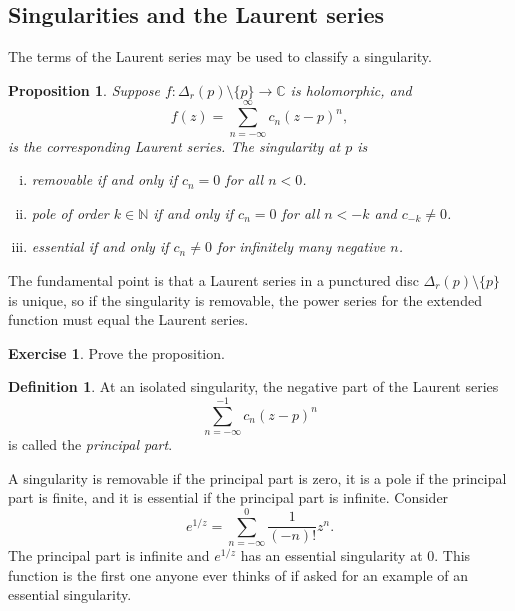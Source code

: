 \documentclass[12pt,openany]{book}
\newcommand{\C}{{\mathbb{C}}}
\newcommand{\N}{{\mathbb{N}}}
\newcommand{\myindex}[1]{#1\index{#1}}
\theoremstyle{plain}
\newtheorem{prop}[thm]{Proposition}
\theoremstyle{remark}
\theoremstyle{definition}
\newtheorem{defn}[thm]{Definition}
\newenvironment{exbox}{%
    \def\FrameCommand{\vrule width 1pt \relax\hspace{10pt}}%
    \MakeFramed{\advance\hsize-\width\FrameRestore}%
}{%
    \endMakeFramed
}
\theoremstyle{exercise}
\newtheorem{exercise}{Exercise}[section]
\theoremstyle{example}
\begin{document}
\subsection{Singularities and the Laurent series}

The terms of the Laurent series may be used to 
classify a singularity.

\begin{prop}
Suppose $f \colon \Delta_r(p) \setminus \{p\} \to \C$ is holomorphic,
and
\begin{equation*}
f(z) = \sum_{n=-\infty}^\infty c_n {(z-p)}^n ,
\end{equation*}
is the corresponding Laurent series.
The singularity at $p$ is
\begin{enumerate}[(i)]
\item \emph{removable} if and only if $c_n = 0$ for all $n < 0$.
\item \emph{pole} of order $k \in \N$ if and only if $c_n = 0$ for all $n < -k$ and
$c_{-k}
\not= 0$.
\item \emph{essential} if and only if $c_n \not= 0$ for infinitely many negative $n$.
\end{enumerate}
\end{prop}

The fundamental point is that a Laurent series in a punctured
disc $\Delta_r(p) \setminus \{p\}$ is unique,
so if the singularity is removable, the power
series for the extended function must equal the Laurent series.

\begin{exbox}
\begin{exercise}
Prove the proposition.
\end{exercise}
\end{exbox}

\begin{defn} \label{defn:principalpart}
At an isolated singularity, the negative part of the Laurent series
\begin{equation*}
\sum_{n=-\infty}^{-1} c_n {(z-p)}^n 
\end{equation*}
is called the \emph{\myindex{principal part}}.
\end{defn}

A singularity is
removable if the principal part is zero, it is a pole if the principal part
is finite, and it is essential if the principal part is infinite.
Consider
\begin{equation*}
e^{1/z}
=
\sum_{n=-\infty}^0 \frac{1}{(-n)!} z^n .
\end{equation*}
The principal part is infinite and $e^{1/z}$ has an essential
singularity at $0$.  This function is the first one anyone ever thinks of
if asked for an example of an essential singularity.
\end{document}
